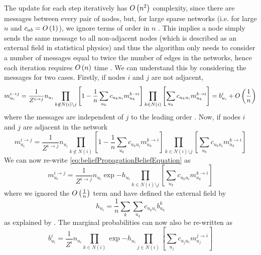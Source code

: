 The update for each step iteratively has $O\left(n^{2}\right)$ complexity, since there are messages between every pair of nodes, but, for large sparse networks (i.e. for large $n$ and $c_{ab} = O\left(1\right)$), we ignore terms of order in $n$ \cite{DKM+13}.
This implies a node simply sends the same message to all non-adjacent nodes (which is described as an external field in statistical physics) and thus the algorithm only needs to consider a number of messages equal to twice the number of edges in the networks, hence each iteration requires $O\left(n\right)$ time \cite{DKM+13}.
We can understand this by considering the messages for two cases. Firstly, if nodes $i$ and $j$ are not adjacent,
\begin{equation}
	\label{eq:beliefPropagationMessageEquation2}
	m_{u_{i}}^{i \rightarrow j} = \frac{1}{Z^{i \rightarrow j}} n_{u_{i}} \prod_{k \not\in N(i) \setminus j} \left[ 1 - \frac{1}{n} \sum_{u_{k}} c_{u_{k}u_{i}} m_{u_{k}}^{k \rightarrow i} \right] \prod_{k \in N(i)} \left[ \sum_{u_{k}} c_{u_{k}u_{i}} m_{u_{k}}^{k \rightarrow i} \right] = b_{u_{i}}^{i} + O\left(\frac{1}{n}\right)
\end{equation} 
 where the messages are independent of $j$ to the leading order \cite{DKM+13}. Now, if nodes $i$ and $j$ are adjacent in the network
\begin{equation}
	\label{eq:beliefPropagationMessageEquation3}
	m_{u_{i}}^{i \rightarrow j} = \frac{1}{Z^{i \rightarrow j}} n_{u_{i}} \prod_{k \not\in N(i)} \left[ 1 - \frac{1}{n} \sum_{u_{k}} c_{u_{k}u_{i}} m_{u_{k}}^{k \rightarrow i} \right] \prod_{k \in N(i) \setminus j} \left[ \sum_{u_{k}} c_{u_{k}u_{i}} m_{u_{k}}^{k \rightarrow i} \right] 
\end{equation}
We can now re-write \cref{eq:beliefPropagationBeliefEquation}  as
\begin{equation}
	\label{eq:beliefPropagationMessageEquation4}
	m_{u_{i}}^{i \rightarrow j} = \frac{1}{Z^{i \rightarrow j}} n_{u_{i}} \exp{-h_{u_{i}}} \prod_{k \in N(i) \setminus j} \left[ \sum_{u_{k}} c_{u_{k}u_{i}} m_{u_{k}}^{k \rightarrow i} \right] 
\end{equation}
where we ignored the $O\left(\frac{1}{n}\right)$ term and have defined the external field by
\begin{equation}
	\label{eq:beliefPropagationExternalField}
	h_{u_{i}} = \frac{1}{n} \sum_{k} \sum_{u_{k}} c_{u_{k}u_{i}} b_{u_{k}}^{k}
\end{equation}
as explained by \cite{DKM+13}. The marginal probabilities can now also be re-written as
\begin{equation}
	\label{eq:beliefPropagationBeliefEquation2}
	b_{u_{i}}^{i} = \frac{1}{Z^{i}} n_{u_{i}} \prod_{k \in N(i)} \exp{-h_{u_{i}}} \prod_{j \in N(i)} \left[ \sum_{u_{j}} c_{u_{j}u_{i}} m_{u_{j}}^{j \rightarrow i} \right] 
\end{equation}
